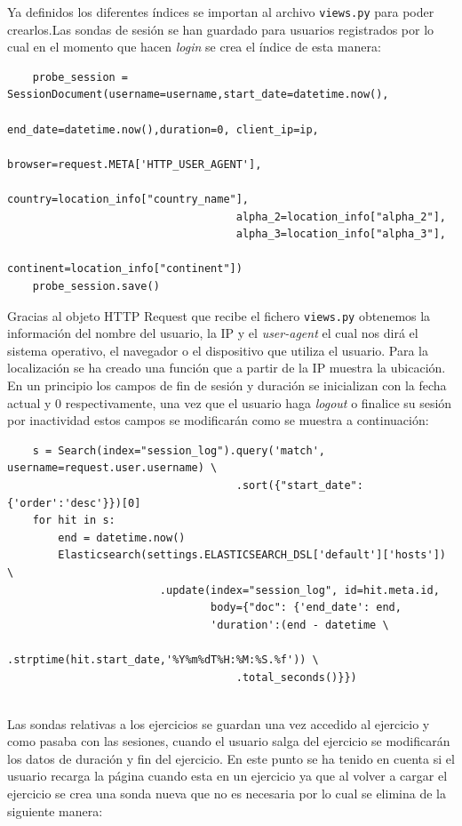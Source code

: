 Ya definidos los diferentes índices se importan al archivo \texttt{views.py} para poder crearlos.Las sondas de sesión se han guardado para usuarios registrados por lo cual en el momento que hacen \textit{login} se crea el índice de esta manera:
\\
{\footnotesize
\begin{verbatim}
    probe_session = SessionDocument(username=username,start_date=datetime.now(),
                                    end_date=datetime.now(),duration=0, client_ip=ip,
                                    browser=request.META['HTTP_USER_AGENT'],
                                    country=location_info["country_name"],
                                    alpha_2=location_info["alpha_2"], 
                                    alpha_3=location_info["alpha_3"],
                                    continent=location_info["continent"])
    probe_session.save()
\end{verbatim}
}
\newpage
Gracias al objeto HTTP Request que recibe el fichero \texttt{views.py} obtenemos la información del nombre del usuario, la IP y el \textit{user-agent} el cual nos dirá el sistema operativo, el navegador o el dispositivo que utiliza el usuario. Para la localización se ha creado una función que a partir de la IP muestra la ubicación. En un principio los campos de fin de sesión y duración se inicializan con la fecha actual y 0 respectivamente, una vez que el usuario haga \textit{logout} o finalice su sesión por inactividad estos campos se modificarán como se muestra a continuación:\\
{\footnotesize
\begin{verbatim}
    s = Search(index="session_log").query('match', username=request.user.username) \
                                    .sort({"start_date": {'order':'desc'}})[0]
    for hit in s:
        end = datetime.now()
        Elasticsearch(settings.ELASTICSEARCH_DSL['default']['hosts']) \
                        .update(index="session_log", id=hit.meta.id,
                                body={"doc": {'end_date': end,
                                'duration':(end - datetime \
                                    .strptime(hit.start_date,'%Y%m%dT%H:%M:%S.%f')) \
                                    .total_seconds()}})
\end{verbatim}
}
\\
Las sondas relativas a los ejercicios se guardan una vez accedido al ejercicio y como pasaba con las sesiones, cuando el usuario salga del ejercicio se modificarán los datos de duración y fin del ejercicio. En este punto se ha tenido en cuenta si el usuario recarga la página cuando esta en un ejercicio ya que al volver a cargar el ejercicio se crea una sonda nueva que no es necesaria por lo cual se elimina de la siguiente manera:\\
